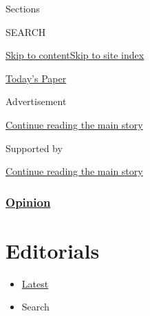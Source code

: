 Sections

SEARCH

\protect\hyperlink{site-content}{Skip to
content}\protect\hyperlink{site-index}{Skip to site index}

\href{https://myaccount.nytimes3xbfgragh.onion/auth/login?response_type=cookie\&client_id=vi}{}

\href{https://www.nytimes3xbfgragh.onion/section/todayspaper}{Today's
Paper}

Advertisement

\protect\hyperlink{after-top}{Continue reading the main story}

Supported by

\protect\hyperlink{after-sponsor}{Continue reading the main story}

\hypertarget{opinion}{%
\subsubsection{\texorpdfstring{\href{/section/opinion}{Opinion}}{Opinion}}\label{opinion}}

\hypertarget{editorials}{%
\section{Editorials}\label{editorials}}

\begin{itemize}
\tightlist
\item
  \protect\hyperlink{stream-panel}{Latest}
\item
  Search
\end{itemize}

